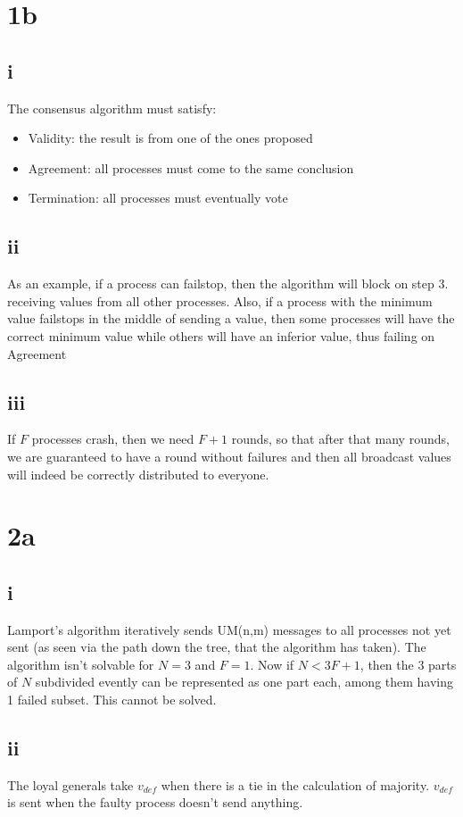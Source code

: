 \documentclass[a4paper,10pt,]{report}
\begin{document}
\section{1b}
\subsection{i}
The consensus algorithm must satisfy:
\begin{itemize}
\item Validity: the result is from one of the ones proposed
\item Agreement: all processes must come to the same conclusion
\item Termination: all processes must eventually vote
\end{itemize}
\subsection{ii}
As an example, if a process can failstop, then the algorithm will block on step 3. receiving values from all other processes.  Also, if a process with the minimum value failstops in the middle of sending a value, then some processes will have the correct minimum value while others will have an inferior value, thus failing on Agreement
\subsection{iii}
If $F$ processes crash, then we need $F+1$ rounds, so that after that many rounds, we are guaranteed to have a round without failures and then all broadcast values will indeed be correctly distributed to everyone.
\section{2a}
\subsection{i}
Lamport's algorithm iteratively sends UM(n,m) messages to all processes not yet sent (as seen via the path down the tree, that the algorithm has taken).  The algorithm isn't solvable for $N=3$ and $F=1$.  Now if $N < 3F + 1$, then the 3 parts of $N$ subdivided evently can be represented as one part each, among them having 1 failed subset.  This cannot be solved.
\subsection{ii}
The loyal generals take $v_{def}$ when there is a tie in the calculation of majority.  $v_{def}$ is sent when the faulty process doesn't send anything.
\end{document}
